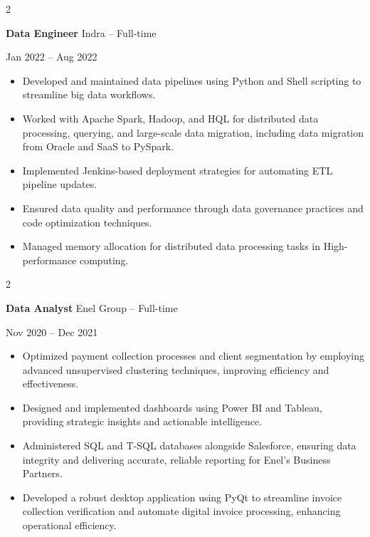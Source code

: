 \documentclass[10pt, letterpaper]{article}
\newenvironment{highlights}{
    \begin{itemize}[
        topsep=0.10 cm,
        parsep=0.10 cm,
        partopsep=0pt,
        itemsep=0pt,
        leftmargin=0 cm + 10pt
    ]
}{
    \end{itemize}
} %
\newenvironment{twocolentry}[2][]{
    \onecolentry
    \def\secondColumn{#2}
    \setcolumnwidth{\fill, 4.5 cm}
    \begin{paracol}{2}
}{
    \switchcolumn \raggedleft \secondColumn
    \end{paracol}
    \endonecolentry
} %
\begin{document}
\begin{twocolentry}{Jan 2022 – Aug 2022}
    \textbf{Data Engineer} \textbar Indra – Full-time
\end{twocolentry}
\begin{highlights}
    \item Developed and maintained data pipelines using Python and Shell scripting to streamline big data workflows.
    \item Worked with Apache Spark, Hadoop, and HQL for distributed data processing, querying, and large-scale data migration, including data migration from Oracle and SaaS to PySpark.
    \item Implemented Jenkins-based deployment strategies for automating ETL pipeline updates.
    \item Ensured data quality and performance through data governance practices and code optimization techniques.
    \item Managed memory allocation for distributed data processing tasks in High-performance computing.
\end{highlights}


\begin{twocolentry}{Nov 2020 – Dec 2021}
    \textbf{Data Analyst} \textbar Enel Group – Full-time
\end{twocolentry}
\begin{highlights}
    \item Optimized payment collection processes and client segmentation by employing advanced unsupervised clustering techniques, improving efficiency and effectiveness.
    \item Designed and implemented dashboards using Power BI and Tableau, providing strategic insights and actionable intelligence.
    \item Administered SQL and T-SQL databases alongside Salesforce, ensuring data integrity and delivering accurate, reliable reporting for Enel's Business Partners.
    \item Developed a robust desktop application using PyQt to streamline invoice collection verification and automate digital invoice processing, enhancing operational efficiency.
\end{highlights}

\vspace{0.3cm}
\end{document}

